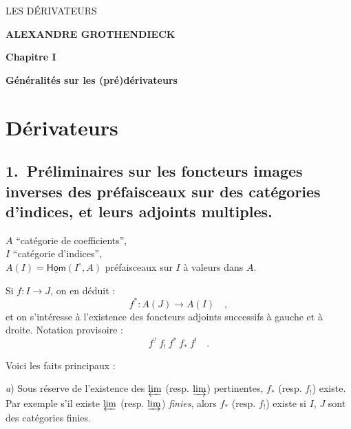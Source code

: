 \documentclass[11pt]{article}
\newcommand{\printedpage}[1]{\marginpar{\footnotesize p.~#1}}
\newcommand{\msp}[1]{\marginpar{\footnotesize [#1]}}
\newcommand{\uHom}{\underline{\mathsf{Hom}}}
\begin{document}
\printedpage{--} %

\begin{center}
{\Large\textsf{LES DÉRIVATEURS}}

\bigskip

\textbf{ALEXANDRE GROTHENDIECK}

\bigskip\bigskip

\textbf{Chapitre I}

\medskip

\textbf{Généralités sur les (pré)dérivateurs}
\end{center}

\clearpage


\printedpage{1}

\msp{page 1}

\section*{Dérivateurs}

\subsection*{\textmd{1.}\ Préliminaires sur les foncteurs images inverses des préfaisceaux sur des catégories d'indices, et leurs adjoints multiples.}

$A$ “catégorie de coefficients”,\\
$I$ “catégorie d'indices”,\\
$A(I)=\uHom(I^{\circ},A)$ préfaisceaux sur $I$ à valeurs dans $A$.

Si $f : I \to J$, on en déduit :
\[
f^{*} : A(J) \to A(I) \quad ,
\]
et on s'intéresse à l'existence des foncteurs adjoints successifs à gauche et à droite. Notation provisoire :
\[
f^{?}\ f_{!}\ f^{*}\ f_{*}\ f^{!} \quad .
\]

Voici les faits principaux :

\textit{a}) Sous réserve de l'existence des $\varprojlim$ (resp. $\varinjlim$) pertinentes, $f_{*}$ (resp. $f_{!}$) existe. Par exemple s'il existe $\varprojlim$ (resp. $\varinjlim$) \textit{finies}, alors $f_{*}$ (resp. $f_{!}$) existe si $I$, $J$ sont des catégories finies.
\end{document}
